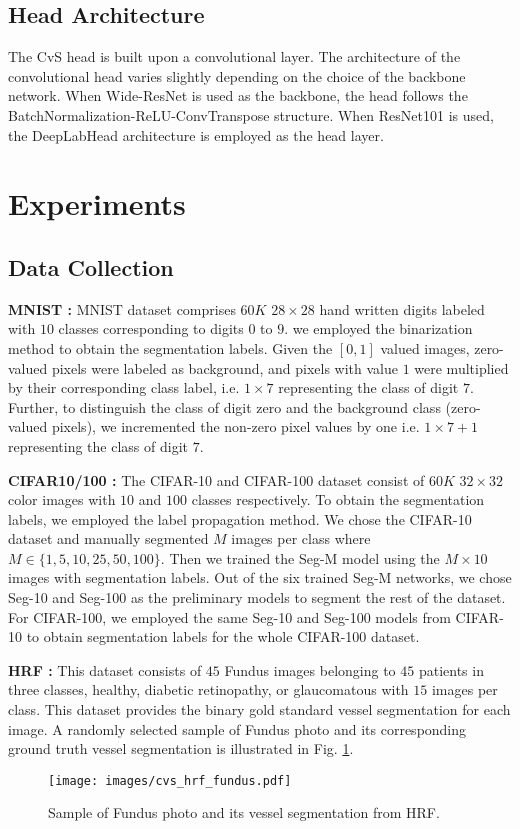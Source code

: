 \documentclass[conference]{IEEEtran}
\begin{document}
\subsection{Head Architecture}
The CvS head is built upon a convolutional layer. The architecture of the convolutional head varies slightly depending on the choice of the backbone network. When Wide-ResNet is used as the backbone, the head follows the BatchNormalization-ReLU-ConvTranspose structure. When ResNet101 is used, the DeepLabHead architecture is employed as the head layer. 

\section{Experiments}
\subsection{Data Collection}

\textbf{MNIST \cite{lecun2010mnist}:} MNIST dataset comprises $60K$ $28\times28$ hand written digits labeled with $10$ classes corresponding to digits $0$ to $9$. we employed the binarization method to obtain the segmentation labels. Given the $[0,1]$ valued images, zero-valued pixels were labeled as background, and pixels with value $1$ were multiplied by their corresponding class label, i.e. $1\times7$ representing the class of digit $7$. Further, to distinguish the class of digit zero and the background class (zero-valued pixels), we incremented the non-zero pixel values by one i.e. $1\times7+1$ representing the class of digit $7$.   

\textbf{CIFAR10/100 \cite{krizhevsky2009learning}:} The CIFAR-10 and CIFAR-100 dataset consist of $60K$ $32\times32$ color images with $10$ and $100$ classes respectively. To obtain the segmentation labels, we employed the label propagation method. We chose the CIFAR-10 dataset and manually segmented $M$ images per class where $M\in \{1, 5, 10, 25, 50, 100\}$. Then we trained the Seg-M model using the $M\times10$ images with segmentation labels. Out of the six trained Seg-M networks, we chose Seg-10 and Seg-100 as the preliminary models to segment the rest of the dataset. For CIFAR-100, we employed the same Seg-10 and Seg-100 models from CIFAR-10 to obtain segmentation labels for the whole CIFAR-100 dataset.

\textbf{HRF \cite{budai2013robust}:} This dataset consists of $45$ Fundus images belonging to $45$ patients in three classes, healthy, diabetic retinopathy, or glaucomatous with $15$ images per class. This dataset provides the binary gold standard vessel segmentation for each image. A randomly selected sample of Fundus photo and its corresponding ground truth vessel segmentation is illustrated in Fig. \ref{fig:fundus}.
\begin{figure}[]
	\centering
	\texttt{[image: images/cvs\_hrf\_fundus.pdf]}
	\caption{Sample of Fundus photo and its vessel segmentation from HRF.}
	\label{fig:fundus}
\end{figure}
\end{document}
